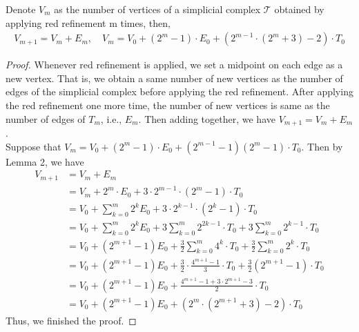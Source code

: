     \begin{lemma}
    Denote $V_{m}$ as the number of vertices of a simplicial complex $\mathcal{T}$ obtained by applying red refinement m times, then,
    \begin{align*}
    V_{m+1} = V_{m} + E_{m}, \quad V_m = V_0 + (2^m -1)\cdot E_0 + (2^{m-1}\cdot(2^m+3)-2)\cdot T_0
    \end{align*}
    \end{lemma}
    \begin{proof}
    Whenever red refinement is applied, we set a midpoint on each edge as a new vertex. That is, we obtain a same number of new vertices as the number of edges of the simplicial complex before applying the red refinement. After applying the red refinement one more time, the number of new vertices is same as the number of edges of $T_m$, i.e., $E_m$. Then adding together, we have $V_{m+1} = V_m + E_m$.\\
    Suppose that $V_m = V_0 + (2^m -1)\cdot E_0 + (2^{m-1} -1)(2^m -1)\cdot T_0$. Then by Lemma 2, we have
    \begin{align*}
    V_{m+1} &= V_m + E_m\\
    &= V_m + 2^m\cdot E_0 + 3\cdot 2^{m-1}\cdot(2^m-1)\cdot T_0\\
    &= V_0 + \sum_{k=0}^m 2^k E_0 + 3\cdot 2^{k-1}\cdot(2^k-1)\cdot T_0\\
    &= V_0 + \sum_{k=0}^m 2^k E_0 + 3\sum_{k=0}^m 2^{2k-1}\cdot T_0 + 3\sum_{k=0}^m 2^{k-1}\cdot T_0\\
    &= V_0 + (2^{m+1}-1)E_0 + \frac{3}{2}\sum_{k=0}^m 4^k\cdot T_0 + \frac{3}{2}\sum_{k=0}^m 2^k\cdot T_0\\
    &= V_0 + (2^{m+1}-1)E_0 + \frac{3}{2}\cdot\frac{4^{m+1}-1}{3}\cdot T_0 + \frac{3}{2}(2^{m+1}-1)\cdot T_0\\
    &= V_0 + (2^{m+1}-1)E_0 + \frac{4^{m+1}-1 + 3\cdot2^{m+1} -3}{2}\cdot T_0\\
    &= V_0 + (2^{m+1}-1)E_0 + (2^m\cdot(2^{m+1}+3)-2)\cdot T_0
    \end{align*}
    Thus, we finished the proof.
    \end{proof}


